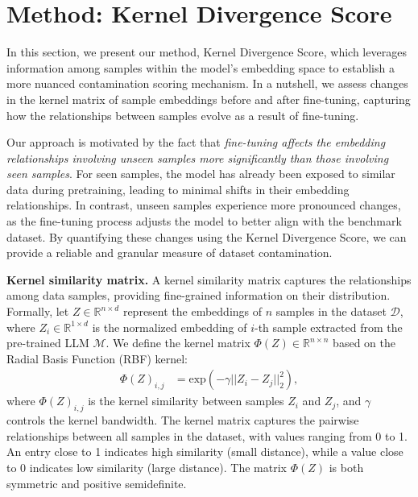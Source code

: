 


\section{Method: Kernel Divergence Score}
\label{sec:methods}
In this section, we present our method, {Kernel Divergence Score}, which leverages information among samples within the model's embedding space to establish a more nuanced contamination scoring mechanism. In a nutshell, we assess changes in the kernel matrix of sample embeddings before and after fine-tuning, capturing how the relationships between samples evolve as a result of fine-tuning.


Our approach is motivated by the fact that \emph{fine-tuning affects the embedding relationships involving unseen samples more significantly than those involving seen samples}. For seen samples, the model has already been exposed to similar data during pretraining, leading to minimal shifts in their embedding relationships. In contrast, unseen samples experience more pronounced changes, as the fine-tuning process adjusts the model to better align with the benchmark dataset. By quantifying these changes using the Kernel Divergence Score, we can provide a reliable and granular measure of dataset contamination.

\noindent\textbf{Kernel similarity matrix.}
A kernel similarity matrix captures the relationships among data samples, providing fine-grained information on their distribution. Formally, let $Z\in \mathbb{R}^{n\times d}$ represent the embeddings of $n$ samples in the dataset $\mathcal{D}$, where $Z_i \in \mathbb{R}^{1\times d}$ is the normalized embedding of $i$-th sample extracted from the pre-trained LLM $\mathcal{M}$. We define the kernel matrix $\Phi(Z) \in \mathbb{R}^{n\times n}$ based on the Radial Basis Function (RBF) kernel:
\begin{equation*}
    \begin{split}
        \Phi(Z)_{i,j} &= \text{exp}(-\gamma||Z_i - Z_j||_2^2),
    \end{split}
\end{equation*}
where $\Phi(Z)_{i,j}$ is the kernel similarity between samples $Z_i$ and $Z_j$, and $\gamma$ controls the kernel bandwidth.  The kernel matrix captures the pairwise relationships between all samples in the dataset, with values ranging from 0 to 1. An entry close to 1 indicates high similarity (small distance), while a value close to 0 indicates low similarity (large distance). The matrix $\Phi(Z)$ is both symmetric and positive semidefinite. 


